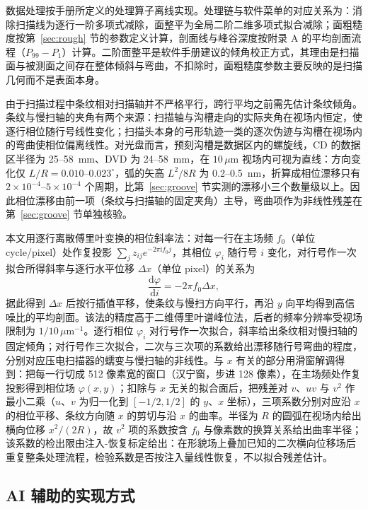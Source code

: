 \documentclass[12pt,a4paper,fontset=windows]{ctexart}
\begin{document}
数据处理按手册所定义的处理算子离线实现。处理链与软件菜单的对应关系为：消除扫描线为逐行一阶多项式减除，面整平为全局二阶二维多项式拟合减除；面粗糙度按第~\ref{sec:rough} 节的参数定义计算，剖面线与峰谷深度按附录 A 的平均剖面流程（$P_{99}-P_1$）计算。二阶面整平是软件手册建议的倾角校正方式，其理由是扫描面与被测面之间存在整体倾斜与弯曲，不扣除时，面粗糙度参数主要反映的是扫描几何而不是表面本身。

由于扫描过程中条纹相对扫描轴并不严格平行，跨行平均之前需先估计条纹倾角。条纹与慢扫轴的夹角有两个来源：扫描轴与沟槽走向的实际夹角在视场内恒定，使逐行相位随行号线性变化；扫描头本身的弓形轨迹一类的逐次伪迹\cite{lipeng2016}与沟槽在视场内的弯曲使相位偏离线性。对光盘而言，预刻沟槽是数据区内的螺旋线，CD 的数据区半径为 25--58~mm、DVD 为 24--58~mm\cite{ecma130,ecma267}，在 $10\,\mu\mathrm{m}$ 视场内可视为直线：方向变化仅 $L/R=0.010$--$0.023^\circ$，弧的矢高 $L^2/8R$ 为 0.2--0.5~nm，折算成相位漂移只有 $2\times10^{-4}$--$5\times10^{-4}$ 个周期，比第~\ref{sec:groove} 节实测的漂移小三个数量级以上。因此相位漂移由前一项（条纹与扫描轴的固定夹角）主导，弯曲项作为非线性残差在第~\ref{sec:groove} 节单独核验。

本文用逐行离散傅里叶变换的相位斜率法：对每一行在主场频 $f_0$（单位 cycle/pixel）处作复投影 $\sum_j z_{ij}e^{-2\pi \mathrm{i} f_0 j}$，其相位 $\varphi_i$ 随行号 $i$ 变化，对行号作一次拟合所得斜率与逐行水平位移 $\Delta x$（单位 pixel）的关系为
\begin{equation}
\frac{\mathrm{d}\varphi}{\mathrm{d}i} = -2\pi f_0 \Delta x ,
\label{eq:tilt}
\end{equation}
据此得到 $\Delta x$ 后按行插值平移，使条纹与慢扫方向平行，再沿 $y$ 向平均得到高信噪比的平均剖面。该法的精度高于二维傅里叶谱峰位法，后者的频率分辨率受视场限制为 $1/10\,\mu\mathrm{m}^{-1}$。逐行相位 $\varphi_i$ 对行号作一次拟合，斜率给出条纹相对慢扫轴的固定倾角；对行号作三次拟合，二次与三次项的系数给出漂移随行号弯曲的程度，分别对应压电扫描器的蠕变与慢扫轴的非线性。与 $x$ 有关的部分用滑窗解调得到：把每一行切成 512 像素宽的窗口（汉宁窗，步进 128 像素），在主场频处作复投影得到相位场 $\varphi(x,y)$；扣除与 $x$ 无关的拟合面后，把残差对 $v$、$uv$ 与 $v^2$ 作最小二乘（$u$、$v$ 为归一化到 $[-1/2,1/2]$ 的 $y$、$x$ 坐标），三项系数分别对应沿 $x$ 的相位平移、条纹方向随 $x$ 的剪切与沿 $x$ 的曲率。半径为 $R$ 的圆弧在视场内给出横向位移 $x^2/(2R)$，故 $v^2$ 项的系数按含 $f_0$ 与像素数的换算关系给出曲率半径；该系数的检出限由注入-恢复标定给出：在形貌场上叠加已知的二次横向位移场后重复整条处理流程，检验系数是否按注入量线性恢复，不以拟合残差估计。


\subsection{AI 辅助的实现方式}
\end{document}
